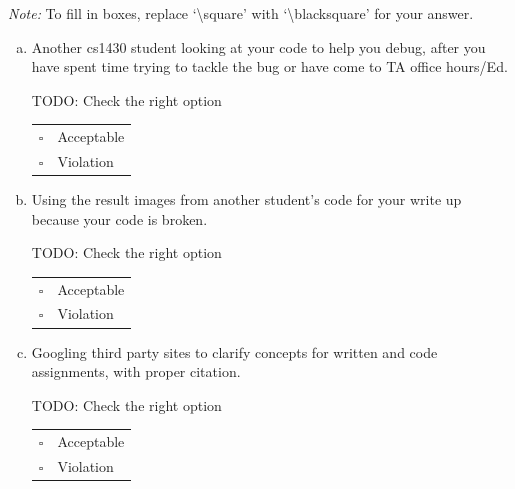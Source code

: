 \documentclass[11pt]{article}
\begin{document}
\emph{Note:} To fill in boxes, replace `\textbackslash square' with `\textbackslash blacksquare' for your answer.

\begin{enumerate}[(a)]
\item
Another cs1430 student looking at your code to help you debug, after you have spent time trying to tackle the bug or have come to TA office hours/Ed.

\begin{tcolorbox}[colback=white!5!white,colframe=green!75!black]
TODO: Check the right option %

\begin{tabular}[h]{ll}
$\square$ & Acceptable \\
$\square$ & Violation \\
\end{tabular}
\end{tcolorbox}

\item
Using the result images from another student's code for your write up because your code is broken.

\begin{tcolorbox}[colback=white!5!white,colframe=green!75!black]
TODO: Check the right option %

\begin{tabular}[h]{ll}
$\square$ & Acceptable \\
$\square$ & Violation \\
\end{tabular}
\end{tcolorbox}

\item
Googling third party sites to clarify concepts for written and code assignments, with proper citation.

\begin{tcolorbox}[colback=white!5!white,colframe=green!75!black]
TODO: Check the right option %

\begin{tabular}[h]{ll}
$\square$ & Acceptable \\
$\square$ & Violation \\
\end{tabular}
\end{tcolorbox}


\end{enumerate}
\end{document}
